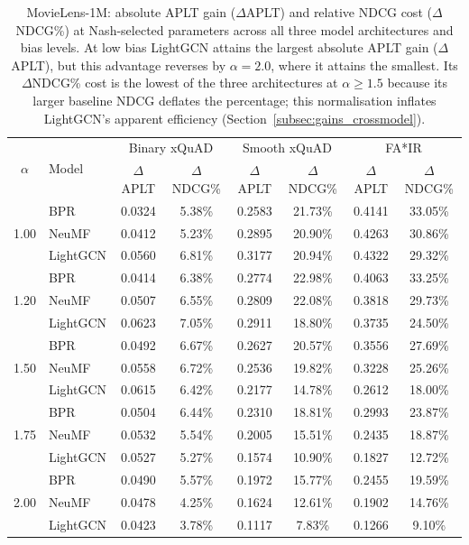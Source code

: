 \begin{table}[htbp]
\centering
\small
\caption{MovieLens-1M: absolute APLT gain ($\Delta$APLT) and relative NDCG cost ($\Delta$NDCG\%) at Nash-selected parameters across all three model architectures and bias levels. At low bias LightGCN attains the largest absolute APLT gain ($\Delta$APLT), but this advantage reverses by $\alpha=2.0$, where it attains the smallest. Its $\Delta$NDCG\% cost is the lowest of the three architectures at $\alpha\ge1.5$ because its larger baseline NDCG deflates the percentage; this normalisation inflates LightGCN's apparent efficiency (Section~\ref{subsec:gains_crossmodel}).}
\label{tab:crossarch_gains_ml}
\begin{tabular}{clcccccc}
\toprule
\multirow{2}{*}{$\alpha$} & \multirow{2}{*}{Model} & \multicolumn{2}{c}{Binary xQuAD} & \multicolumn{2}{c}{Smooth xQuAD} & \multicolumn{2}{c}{FA*IR} \\
 & & $\Delta$APLT & $\Delta$NDCG\% & $\Delta$APLT & $\Delta$NDCG\% & $\Delta$APLT & $\Delta$NDCG\% \\
\midrule
\multirow{3}{*}{1.00}
 & BPR & 0.0324 & 5.38\% & 0.2583 & 21.73\% & 0.4141 & 33.05\% \\
 \rowcolor{gray!6} & NeuMF & 0.0412 & 5.23\% & 0.2895 & 20.90\% & 0.4263 & 30.86\% \\
 & LightGCN & 0.0560 & 6.81\% & 0.3177 & 20.94\% & 0.4322 & 29.32\% \\
\midrule
\multirow{3}{*}{1.20}
 & BPR & 0.0414 & 6.38\% & 0.2774 & 22.98\% & 0.4063 & 33.25\% \\
 \rowcolor{gray!6} & NeuMF & 0.0507 & 6.55\% & 0.2809 & 22.08\% & 0.3818 & 29.73\% \\
 & LightGCN & 0.0623 & 7.05\% & 0.2911 & 18.80\% & 0.3735 & 24.50\% \\
\midrule
\multirow{3}{*}{1.50}
 & BPR & 0.0492 & 6.67\% & 0.2627 & 20.57\% & 0.3556 & 27.69\% \\
 \rowcolor{gray!6} & NeuMF & 0.0558 & 6.72\% & 0.2536 & 19.82\% & 0.3228 & 25.26\% \\
 & LightGCN & 0.0615 & 6.42\% & 0.2177 & 14.78\% & 0.2612 & 18.00\% \\
\midrule
\multirow{3}{*}{1.75}
 & BPR & 0.0504 & 6.44\% & 0.2310 & 18.81\% & 0.2993 & 23.87\% \\
 \rowcolor{gray!6} & NeuMF & 0.0532 & 5.54\% & 0.2005 & 15.51\% & 0.2435 & 18.87\% \\
 & LightGCN & 0.0527 & 5.27\% & 0.1574 & 10.90\% & 0.1827 & 12.72\% \\
\midrule
\multirow{3}{*}{2.00}
 & BPR & 0.0490 & 5.57\% & 0.1972 & 15.77\% & 0.2455 & 19.59\% \\
 \rowcolor{gray!6} & NeuMF & 0.0478 & 4.25\% & 0.1624 & 12.61\% & 0.1902 & 14.76\% \\
 & LightGCN & 0.0423 & 3.78\% & 0.1117 & 7.83\% & 0.1266 & 9.10\% \\
\bottomrule
\end{tabular}
\end{table}